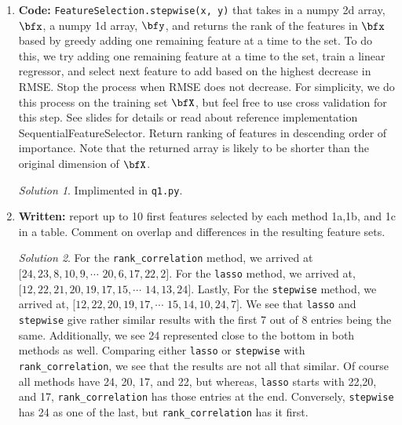 \documentclass[a4paper,12pt]{article}
\theoremstyle{definition}
\theoremstyle{remark}
\newtheorem*{solution}{Solution}
\begin{document}
\begin{enumerate}
\begin{enumerate}
			\item {\bf Code:} {\tt FeatureSelection.stepwise(x, y)} that takes in a numpy 2d array, $\bfx$, a numpy 1d array, $\bfy$, and returns the rank of the features in $\bfx$ based by greedy adding one remaining feature at a time to the set. To do this, we try adding one remaining feature at a time to the set, train a linear regressor, and select next feature to add based on the highest decrease in RMSE. Stop the process when RMSE does not decrease. For simplicity, we do this process on the training set $\bfX$, but feel free to use cross validation for this step. See slides for details or read about reference implementation SequentialFeatureSelector. Return ranking of features in descending order of importance. Note that the returned array is likely to be shorter than the original dimension of $\bfX$.
			\begin{solution}
					Implimented in \texttt{q1.py}.
			\end{solution}
			\item {\bf Written:} report up to 10 first features selected by each method 1a,1b, and 1c in a table. Comment on overlap and
			differences in the resulting feature sets.
			\begin{solution}
				For the {\tt rank\_correlation} method, we arrived at $[24, 23,  8, 10,  9,\cdots$ $20,  6, 17, 22,  2]$. For the {\tt lasso} method, we arrived at, $[12, 22, 21, 20, 19, 17, 15,\cdots$ $ 14, 13, 24]$. Lastly, For the {\tt stepwise} method, we arrived at, $[12, 22, 20, 19, 17, \cdots$ $15, 14, 10, 24,  7]$. We see that {\tt lasso} and {\tt stepwise} give rather similar results with the first 7 out of 8 entries being the same. Additionally, we see 24 represented close to the bottom in both methods as well. Comparing either {\tt lasso} or {\tt stepwise} with {\tt rank\_correlation}, we see that the results are not all that similar. Of course all methods have 24, 20, 17, and 22, but whereas, {\tt lasso} starts with 22,20, and 17, {\tt rank\_correlation} has those entries at the end. Conversely, {\tt stepwise } has 24 as one of the last, but {\tt rank\_correlation} has it first. 
				

\end{solution}
\end{enumerate}
\end{enumerate}
\end{document}
